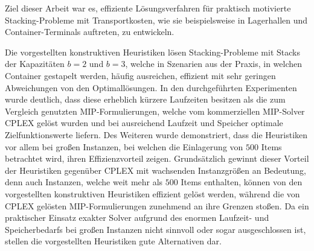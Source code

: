 Ziel dieser Arbeit war es, effiziente Lösungsverfahren für praktisch motivierte Stacking-Probleme mit Transportkosten,
wie sie beispielsweise in Lagerhallen und Container-Terminals auftreten, zu entwickeln.

Die vorgestellten konstruktiven Heuristiken lösen Stacking-Probleme mit Stacks der Kapazitäten $b = 2$ und $b = 3$,
welche in Szenarien aus der Praxis, in welchen Container gestapelt werden, häufig ausreichen, effizient mit sehr geringen Abweichungen von den Optimallösungen. In den durchgeführten Experimenten wurde deutlich, dass diese erheblich kürzere Laufzeiten besitzen als die zum Vergleich genutzten MIP-Formulierungen, welche vom kommerziellen MIP-Solver \textsc{CPLEX} gelöst wurden und bei ausreichend Laufzeit und Speicher optimale Zielfunktionswerte liefern.
Des Weiteren wurde demonstriert, dass die Heuristiken vor allem bei großen Instanzen, bei welchen die Einlagerung
von $500$ Items betrachtet wird, ihren Effizienzvorteil zeigen.
Grundsätzlich gewinnt dieser Vorteil der Heuristiken gegenüber \textsc{CPLEX} mit wachsenden Instanzgrößen
an Bedeutung, denn auch Instanzen, welche weit mehr als $500$ Items enthalten, können von den vorgestellten
konstruktiven Heuristiken effizient gelöst werden, während die von \textsc{CPLEX} gelösten MIP-Formulierungen
zunehmend an ihre Grenzen stoßen. Da ein praktischer Einsatz exakter Solver aufgrund des enormen Laufzeit- und Speicherbedarfs bei großen Instanzen nicht sinnvoll oder sogar ausgeschlossen ist, stellen die vorgestellten Heuristiken gute Alternativen dar.

